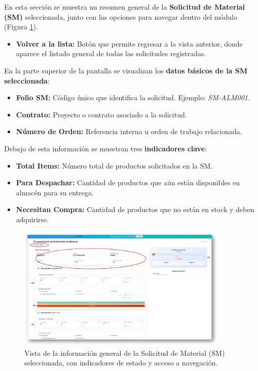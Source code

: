 En esta sección se muestra un resumen general de la \textbf{Solicitud de Material (SM)} seleccionada, junto con las opciones para navegar dentro del módulo (Figura \ref{fig:info_general_sm}).

\begin{itemize}
    \item \textbf{Volver a la lista:} Botón que permite regresar a la vista anterior, donde aparece el listado general de todas las solicitudes registradas.
\end{itemize}

En la parte superior de la pantalla se visualizan los \textbf{datos básicos de la SM seleccionada}:

\begin{itemize}
    \item \textbf{Folio SM:} Código único que identifica la solicitud. Ejemplo: \textit{SM-ALM001}.
    \item \textbf{Contrato:} Proyecto o contrato asociado a la solicitud.
    \item \textbf{Número de Orden:} Referencia interna u orden de trabajo relacionada.
\end{itemize}

Debajo de esta información se muestran tres \textbf{indicadores clave}:

\begin{itemize}
    \item \textbf{Total Items:} Número total de productos solicitados en la SM.
    \item \textbf{Para Despachar:} Cantidad de productos que aún están disponibles en almacén para su entrega.
    \item \textbf{Necesitan Compra:} Cantidad de productos que no están en stock y deben adquirirse.
\end{itemize}

\begin{figure}[H]
    \centering
    \includegraphics[width=0.9\textwidth]{imgs/Almacen_General/Procesamiento_SM/informacion_general_solicitud.png}
    \caption{Vista de la información general de la Solicitud de Material (SM) seleccionada, con indicadores de estado y acceso a navegación.}
    \label{fig:info_general_sm}
\end{figure}


